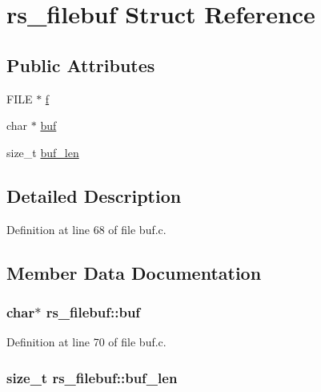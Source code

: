 \hypertarget{structrs__filebuf}{}\section{rs\+\_\+filebuf Struct Reference}
\label{structrs__filebuf}
\subsection*{Public Attributes}
\begin{DoxyCompactItemize}
\item 
F\+I\+L\+E $\ast$ \hyperlink{structrs__filebuf_a85a798132d00137243988597857297c5}{f}
\item 
char $\ast$ \hyperlink{structrs__filebuf_a5bc858fa2122522d463270365c579ebb}{buf}
\item 
size\+\_\+t \hyperlink{structrs__filebuf_ad479966781a90d60d7702da47804dc29}{buf\+\_\+len}
\end{DoxyCompactItemize}


\subsection{Detailed Description}


Definition at line 68 of file buf.\+c.



\subsection{Member Data Documentation}
\hypertarget{structrs__filebuf_a5bc858fa2122522d463270365c579ebb}{}
\subsubsection[{buf}]{\setlength{\rightskip}{0pt plus 5cm}char$\ast$ rs\+\_\+filebuf\+::buf}\label{structrs__filebuf_a5bc858fa2122522d463270365c579ebb}


Definition at line 70 of file buf.\+c.

\hypertarget{structrs__filebuf_ad479966781a90d60d7702da47804dc29}{}
\subsubsection[{buf\+\_\+len}]{\setlength{\rightskip}{0pt plus 5cm}size\+\_\+t rs\+\_\+filebuf\+::buf\+\_\+len}\label{structrs__filebuf_ad479966781a90d60d7702da47804dc29}


